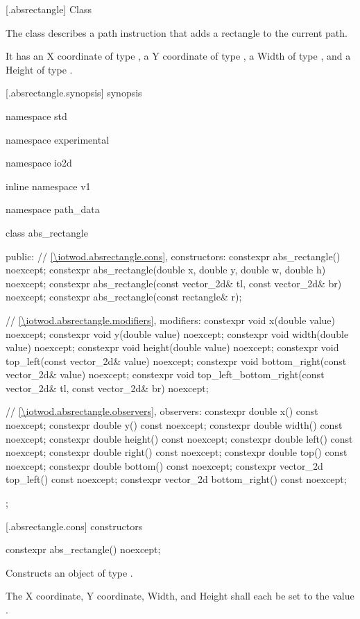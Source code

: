  [\iotwod.absrectangle] {Class }

\pnum
{}
The class  describes a path instruction that adds a rectangle to the current path.

\pnum
It has an X coordinate of type , a Y coordinate of type , a Width of type , and a Height of type .

 [\iotwod.absrectangle.synopsis] { synopsis}

\begin{codeblock}
namespace std { namespace experimental { namespace io2d { inline namespace v1 {
  namespace path_data {
    class abs_rectangle {
    public:
      // \ref{\iotwod.absrectangle.cons}, constructors:
      constexpr abs_rectangle() noexcept;
      constexpr abs_rectangle(double x, double y, double w, double h) noexcept;
      constexpr abs_rectangle(const vector_2d& tl, const vector_2d& br) 
        noexcept;
      constexpr abs_rectangle(const rectangle& r);

      // \ref{\iotwod.absrectangle.modifiers}, modifiers:
      constexpr void x(double value) noexcept;
      constexpr void y(double value) noexcept;
      constexpr void width(double value) noexcept;
      constexpr void height(double value) noexcept;
      constexpr void top_left(const vector_2d& value) noexcept;
      constexpr void bottom_right(const vector_2d& value) noexcept;
      constexpr void top_left_bottom_right(const vector_2d& tl,
        const vector_2d& br) noexcept;

      // \ref{\iotwod.absrectangle.observers}, observers:
      constexpr double x() const noexcept;
      constexpr double y() const noexcept;
      constexpr double width() const noexcept;
      constexpr double height() const noexcept;
      constexpr double left() const noexcept;
      constexpr double right() const noexcept;
      constexpr double top() const noexcept;
      constexpr double bottom() const noexcept;
      constexpr vector_2d top_left() const noexcept;
      constexpr vector_2d bottom_right() const noexcept;
    };
  }
} } } }
\end{codeblock}

 [\iotwod.absrectangle.cons] { constructors}

\begin{itemdecl}
constexpr abs_rectangle() noexcept;
\end{itemdecl}
\begin{itemdescr}
\pnum
\effects
Constructs an object of type .

\pnum
The X coordinate, Y coordinate, Width, and Height shall each be set to the value .
\end{itemdescr}

